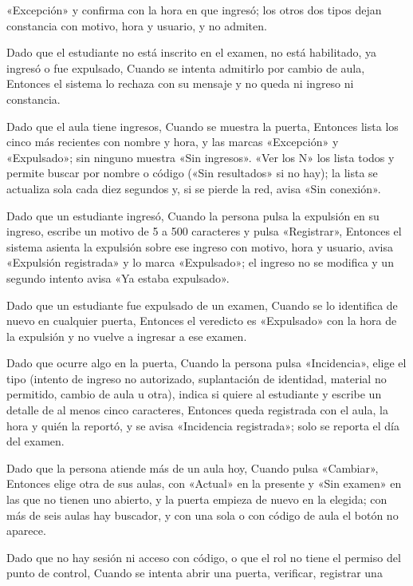 {      «Excepción» y confirma con la hora en que ingresó; los otros dos tipos dejan
      constancia con motivo, hora y usuario, y no admiten.
\item Dado que el estudiante no está inscrito en el examen, no está habilitado, ya ingresó
      o fue expulsado, Cuando se intenta admitirlo por cambio de aula, Entonces el
      sistema lo rechaza con su mensaje y no queda ni ingreso ni constancia.
\item Dado que el aula tiene ingresos, Cuando se muestra la puerta, Entonces lista los
      cinco más recientes con nombre y hora, y las marcas «Excepción» y «Expulsado»; sin
      ninguno muestra «Sin ingresos». «Ver los N» los lista todos y permite buscar por
      nombre o código («Sin resultados» si no hay); la lista se actualiza sola cada diez
      segundos y, si se pierde la red, avisa «Sin conexión».
\item Dado que un estudiante ingresó, Cuando la persona pulsa la expulsión en su ingreso,
      escribe un motivo de 5 a 500 caracteres y pulsa «Registrar», Entonces el sistema
      asienta la expulsión sobre ese ingreso con motivo, hora y usuario, avisa «Expulsión
      registrada» y lo marca «Expulsado»; el ingreso no se modifica y un segundo intento
      avisa «Ya estaba expulsado».
\item Dado que un estudiante fue expulsado de un examen, Cuando se lo identifica de nuevo
      en cualquier puerta, Entonces el veredicto es «Expulsado» con la hora de la
      expulsión y no vuelve a ingresar a ese examen.
\item Dado que ocurre algo en la puerta, Cuando la persona pulsa «Incidencia», elige el
      tipo (intento de ingreso no autorizado, suplantación de identidad, material no
      permitido, cambio de aula u otra), indica si quiere al estudiante y escribe un
      detalle de al menos cinco caracteres, Entonces queda registrada con el aula, la
      hora y quién la reportó, y se avisa «Incidencia registrada»; solo se reporta el día
      del examen.
\item Dado que la persona atiende más de un aula hoy, Cuando pulsa «Cambiar», Entonces
      elige otra de sus aulas, con «Actual» en la presente y «Sin examen» en las que no
      tienen uno abierto, y la puerta empieza de nuevo en la elegida; con más de seis
      aulas hay buscador, y con una sola o con código de aula el botón no aparece.
\item Dado que no hay sesión ni acceso con código, o que el rol no tiene el permiso del
      punto de control, Cuando se intenta abrir una puerta, verificar, registrar una
}
